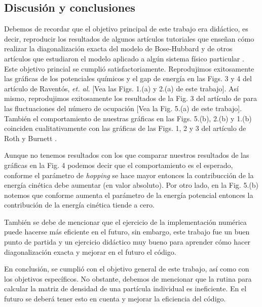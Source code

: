 \documentclass[11pt,letterpaper]{article}
\begin{document}
\subsection{Discusión y conclusiones}
Debemos de recordar que el objetivo principal de este trabajo era didáctico, 
es decir, reproducir los resultados de algunos artículos tutoriales
\cite{zhang2010exact,raventos2017cold} que enseñan cómo realizar la diagonalización exacta del 
modelo de Bose-Hubbard y de otros artículos que estudiaron el modelo 
aplicado a algún sistema físico particular \cite{roth2003phase}. Este
objetivo princial se cumplió satisfactoriamente. Reprodujimos exitosamente
las gráficas de los potenciales químicos 
y el gap de energía en las Figs. 3 y 4 del artículo de Raventós, \textit{et. al.}
\cite{raventos2017cold} [Vea las Figs. 1.(a) y 2.(a) de este trabajo].
Así mismo, reprodujimos exitosamente los resultados de la Fig. 3 del 
artículo de \cite{zhang2010exact} para las fluctuaciones del número de
ocupación [Vea la Fig. 5.(a) de este trabajo]. También el comportamiento
de nuestras gráficas en las Figs. 5.(b), 2.(b) y 1.(b) coinciden 
cualitativamente con las gráficas de las Figs. 1, 2 y 3 del artículo 
de Roth y Burnett \cite{roth2003phase}.

Aunque no tenemos resultados con los que comparar nuestros resultados
de las gráficas en la Fig. 4 podemos decir que el comportamiento es 
el esperado, conforme el parámetro de \textit{hopping} se hace mayor
entonces la contribucción de la energía cinética debe aumentar (en 
valor absoluto). Por otro lado, en la Fig. 5.(b) notemos que conforme
aumenta el parámetro de la energía potencial entonces la contribución 
de la energía cinética tiende a cero. 

También se debe de mencionar que el ejercicio de la implementación numérica
puede hacerse más eficiente en el futuro, sin embargo, este trabajo fue un buen 
punto de partida y un ejercicio didáctico muy bueno para aprender cómo 
hacer diagonalización exacta y mejorar en el futuro el código.

En conclusión, se cumplió con el objetivo general de este trabajo, así 
como con los objetivos específicos. No obstante, debemos de mencionar que
la rutina para calcular la matriz de densidad de una partícula individual 
es ineficiente. En el futuro se deberá tener esto en cuenta y mejorar
la eficiencia del código.



\end{document}
